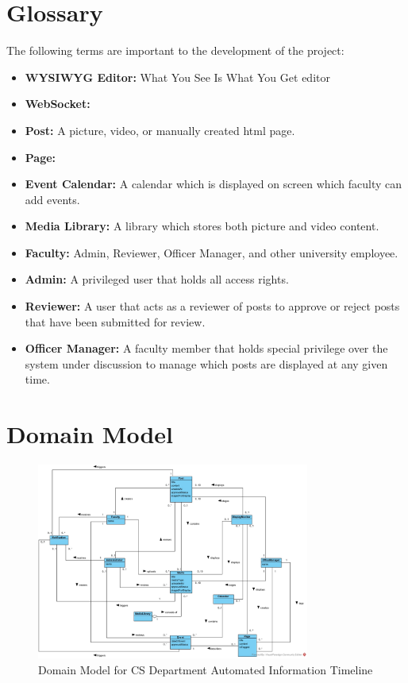 \documentclass{article}
\begin{document}
\section{Glossary}
The following terms are important to the development of the project:
\begin{itemize}
    \item \textbf{WYSIWYG Editor:} What You See Is What You Get editor
    \item \textbf{WebSocket:}
    \item \textbf{Post:} A picture, video, or manually created html page.
    \item \textbf{Page:}
    \item \textbf{Event Calendar:} A calendar which is displayed on screen which faculty can add events.
    \item \textbf{Media Library:} A library which stores both picture and video content.
    \item \textbf{Faculty:} Admin, Reviewer, Officer Manager, and other university employee.
    \item \textbf{Admin:} A privileged user that holds all access rights.
    \item \textbf{Reviewer:} A user that acts as a reviewer of posts to approve or reject posts that have been submitted for review.
    \item \textbf{Officer Manager:} A faculty member that holds special privilege over the system under discussion to manage which posts are displayed at any given time.
\end{itemize}
\section{Domain Model}
\begin{figure}[H]
    \centering
    \includegraphics[width=0.8\textwidth]{images/DomainModel.jpg}
    \centering
    \caption{Domain Model for CS Department Automated Information Timeline}
\end{figure}
\end{document}
